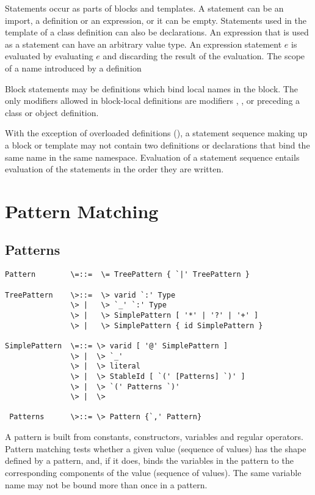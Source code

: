 \documentclass[11pt]{report}
\begin{document}
Statements occur as parts of blocks and templates.  A statement can be
an import, a definition or an expression, or it can be empty.
Statements used in the template of a class definition can also be
declarations.  An expression that is used as a statement can have an
arbitrary value type. An expression statement $e$ is evaluated by
evaluating $e$ and discarding the result of the evaluation. The scope
of a name introduced by a definition

Block statements may be definitions which bind local names in the
block. The only modifiers allowed in block-local definitions are modifiers
\verb@abstract@, \verb@final@, or \verb@sealed@ preceding a class or
object definition.

With the exception of overloaded definitions
(), a statement sequence making up a block
or template may not contain two definitions or declarations that bind
the same name in the same namespace.  Evaluation of a statement
sequence entails evaluation of the statements in the order they are
written.

\chapter{Pattern Matching}

\section{Patterns}


\label{sec:patterns}

\syntax\begin{verbatim}
Pattern        \=::=  \= TreePattern { `|' TreePattern }

TreePattern    \>::=  \> varid `:' Type
               \> |   \> `_' `:' Type
               \> |   \> SimplePattern [ '*' | '?' | '+' ]
               \> |   \> SimplePattern { id SimplePattern }

SimplePattern  \=::= \> varid [ '@' SimplePattern ]
               \> |  \> `_'
               \> |  \> literal
               \> |  \> StableId [ `(' [Patterns] `)' ]
               \> |  \> `(' Patterns `)'
               \> |  \> 

 Patterns      \>::= \> Pattern {`,' Pattern}
\end{verbatim}

A pattern is built from constants, constructors, variables and regular
operators. Pattern matching tests whether a given value (sequence
of values) has the shape defined by a pattern, and, if it does, binds
the variables in the pattern to the corresponding components of the
value (sequence of values).  The same variable name may not be
bound more than once in a pattern.
\end{document}
